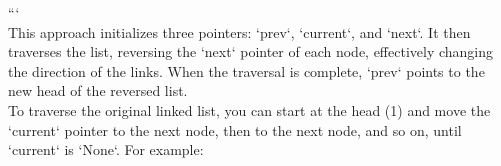 \documentclass[preview]{standalone}
\begin{document}
```\\This approach initializes three pointers: `prev`, `current`, and `next`. It then traverses the list, reversing the `next` pointer of each node, effectively changing the direction of the links. When the traversal is complete, `prev` points to the new head of the reversed list.\\To traverse the original linked list, you can start at the head (1) and move the `current` pointer to the next node, then to the next node, and so on, until `current` is `None`. For example:\\
\end{document}

